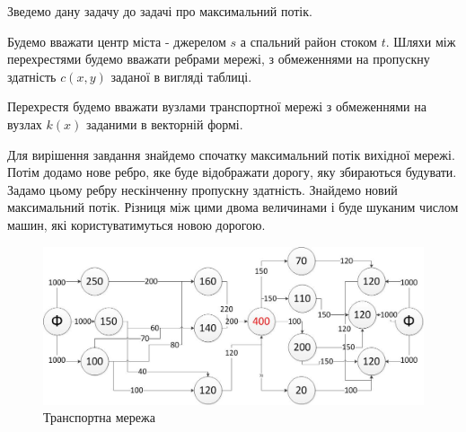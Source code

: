 \documentclass[a4paper,14pt,russian,ukrainian,oneside,final]{extreport}
\begin{document}
\indent
Зведемо дану задачу до задачі про максимальний потік.
\par Будемо вважати центр міста - джерелом $s$ а спальний район стоком $t$. Шляхи між перехрестями будемо вважати ребрами мережі, з обмеженнями на пропускну здатність $c(x,y)$ заданої в вигляді таблиці.
\par Перехрестя будемо вважати вузлами транспортної мережі з обмеженнями на вузлах $k(x)$ заданими в векторній формі.
\par Для вирішення завдання знайдемо спочатку максимальний потік вихідної мережі. Потім додамо нове ребро, яке буде відображати дорогу, яку збираються будувати. Задамо цьому ребру нескінченну пропускну здатність. Знайдемо новий максимальний потік. Різниця між цими двома величинами і буде шуканим числом машин, які користуватимуться новою дорогою.
\begin{figure}[h]
\begin{center}
\includegraphics[scale=0.6]{p3.jpg}
\caption{Транспортна мережа}
\end{center}
\end{figure}
\\
\end{document}
